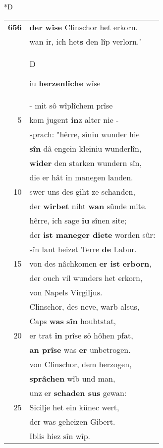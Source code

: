 \documentclass[8pt,a4paper,notitlepage]{article}
\begin{document}
\begin{table}[ht]
\begin{minipage}[t]{0.5\linewidth}
\small
\begin{center}*D
\end{center}
\begin{tabular}{rl}
\textbf{656} & \textbf{der} \textbf{wîse} Clinschor het erkorn.\\ 
 & wan ir, ich het\textbf{s} den lîp verlorn."\\ 
 & \begin{large}D\end{large}iu \textbf{herzenlîche} wîse\\ 
 & - mit sô wîplîchem prîse\\ 
5 & kom jugent \textbf{in}z alter nie -\\ 
 & sprach: "hêrre, sîniu wunder hie\\ 
 & \textbf{sîn} dâ engein kleiniu wunderlîn,\\ 
 & \textbf{wider} den starken wundern sîn,\\ 
 & die er hât in manegen landen.\\ 
10 & swer uns des giht ze schanden,\\ 
 & der \textbf{wirbet} niht \textbf{wan} sünde mite.\\ 
 & hêrre, ich sage \textbf{iu} sînen site;\\ 
 & der \textbf{ist maneger diete} worden sûr:\\ 
 & sîn lant heizet Terre \textbf{de} Labur.\\ 
15 & von des nâchkomen \textbf{er ist} \textbf{erborn},\\ 
 & der ouch vil wunders het erkorn,\\ 
 & von Napels Virgiljus.\\ 
 & Clinschor, des neve, warb alsus,\\ 
 & Caps \textbf{was} \textbf{sîn} houbtstat,\\ 
20 & er trat \textbf{in} prîse sô hôhen pfat,\\ 
 & \textbf{an prîse} was \textbf{er} unbetrogen.\\ 
 & von Clinschor, dem herzogen,\\ 
 & \textbf{sprâchen} wîb und man,\\ 
 & unz er \textbf{schaden sus} gewan:\\ 
25 & Sicilje het ein künec wert,\\ 
 & der was geheizen Gibert.\\ 
 & Iblis hiez sîn wîp.\\ 

\end{tabular}
\end{minipage}
\end{table}
\end{document}
